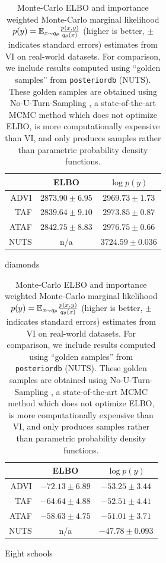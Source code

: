 \documentclass{article}
\theoremstyle{definition}
\theoremstyle{remark}
\begin{document}
\begin{table}[htbp]
  \centering
    \begin{subfigure}[t]{0.49\textwidth}
        \centering
        \begin{tabular}{rcc}
            \toprule
                      & ELBO                & $\log p(y)$       \\
            \midrule
            ADVI      & $2873.90 \pm 6.95$    & $2969.73 \pm 1.73$ \\
            TAF       & $2839.64 \pm 9.10$    & $2973.85 \pm 0.87$ \\
            ATAF      & $2842.75 \pm 8.83$    & $2976.75 \pm 0.66$ \\
            NUTS      & n/a                  & $3724.59 \pm 0.036$ \\
            \bottomrule
        \end{tabular}
        \caption{diamonds}
        \label{tab:diamonds}
    \end{subfigure}
    \begin{subfigure}[t]{0.49\textwidth}
        \centering
        \begin{tabular}{rcc}
            \toprule
                      & ELBO                & $\log p(y)$       \\
            \midrule
            ADVI      & $-72.13 \pm 6.89$    & $-53.25 \pm 3.44$ \\
            TAF       & $-64.64 \pm 4.88$    & $-52.51 \pm 4.41$ \\
            ATAF      & $-58.63 \pm 4.75$    & $-51.01 \pm 3.71$ \\
            NUTS      & n/a                  & $-47.78 \pm 0.093$ \\
            \bottomrule
        \end{tabular}
        \caption{Eight schools}
        \label{tab:eight_schools}
    \end{subfigure}

        \caption{Monte-Carlo ELBO and importance weighted Monte-Carlo marginal likelihood
        $p(y) = \mathbb{E}_{x \sim q_\theta} \frac{p(x,y)}{q_\theta(x)}$ (higher is better, $\pm$ indicates standard errors) 
        estimates from VI on real-world datasets.
        For comparison, we include results computed using ``golden samples'' from \texttt{posteriordb} \citep{ghposteriordb} (NUTS).
        These golden samples are obtained using No-U-Turn-Sampling \citep{hoffman2014no,carpenter2017stan},
        a state-of-the-art MCMC method which does not optimize ELBO, is more computationally expensive than
        VI, and only produces samples rather than parametric probability density functions.
    }
  \label{fig:eight_schools}
  \vspace{-4mm}
\end{table}
\end{document}
